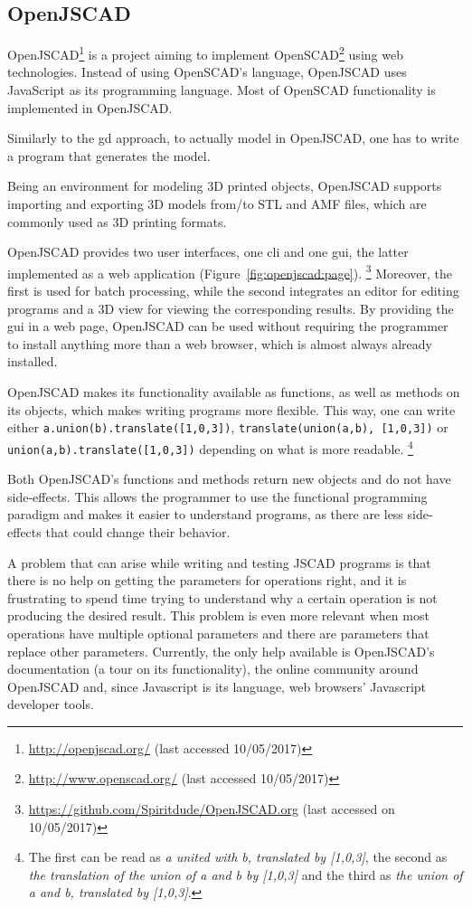 \subsection{OpenJSCAD}
OpenJSCAD\footnote{\url{http://openjscad.org/} (last accessed 10/05/2017)} is a project aiming to implement OpenSCAD\footnote{\url{http://www.openscad.org/} (last accessed 10/05/2017)} using web technologies.
Instead of using OpenSCAD's language, OpenJSCAD uses JavaScript as its programming language.
Most of OpenSCAD functionality is implemented in OpenJSCAD.

Similarly to the \gls{gd} approach, to actually model in OpenJSCAD, one has to write a program that generates the model.

Being an environment for modeling 3D printed objects, OpenJSCAD supports importing and exporting 3D models from/to STL and AMF files, which are commonly used as 3D printing formats.

OpenJSCAD provides two user interfaces, one \acrfull{cli} and one \acrfull{gui}, the latter implemented as a web application (Figure~\ref{fig:openjscad:page}).%
\footnote{\url{https://github.com/Spiritdude/OpenJSCAD.org} (last accessed on 10/05/2017)}
Moreover, the first is used for batch processing, while the second integrates an editor for editing programs and a 3D view for viewing the corresponding results.
By providing the \gls{gui} in a web page, OpenJSCAD can be used without requiring the programmer to install anything more than a web browser, which is almost always already installed.

OpenJSCAD makes its functionality available as functions, as well as methods on its objects, which makes writing programs more flexible.
This way, one can write either \texttt{a.union(b).translate([1,0,3])}, \texttt{translate(union(a,b), [1,0,3])} or \texttt{union(a,b).translate([1,0,3])} depending on what is more readable.%
\footnote{The first can be read as \emph{a united with b, translated by [1,0,3]}, the second as \emph{the translation of the union of a and b by [1,0,3]} and the third as \emph{the union of a and b, translated by [1,0,3]}.}

Both OpenJSCAD's functions and methods return new objects and do not have side-effects.
This allows the programmer to use the functional programming paradigm and makes it easier to understand programs, as there are less side-effects that could change their behavior.

A problem that can arise while writing and testing JSCAD programs is that there is no help on getting the parameters for operations right, and it is frustrating to spend time trying to understand why a certain operation is not producing the desired result.
This problem is even more relevant when most operations have multiple optional parameters and there are parameters that replace other parameters.
Currently, the only help available is OpenJSCAD's documentation (a tour on its functionality), the online community around OpenJSCAD and, since Javascript is its language, web browsers' Javascript developer tools.

